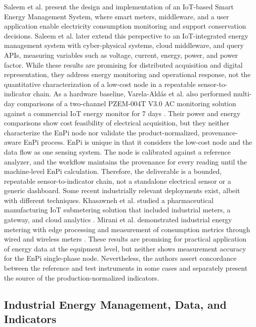 \documentclass[technologies,article,submit,pdftex,moreauthors]{Definitions/mdpi}
\begin{document}
Saleem et al. \cite{ref1} present the design and implementation of an IoT-based Smart Energy Management System, where smart meters, middleware, and a user application enable electricity consumption monitoring and support conservation decisions. Saleem et al. \cite{ref4} later extend this perspective to an IoT-integrated energy management system with cyber-physical systems, cloud middleware, and query APIs, measuring variables such as voltage, current, energy, power, and power factor. 
While these results are promising for distributed acquisition and digital representation, they address energy monitoring and operational response, not the quantitative characterization of a low-cost node in a repeatable sensor-to-indicator chain. As a hardware baseline, Varela-Aldás et al. also performed multi-day comparisons of a two-channel PZEM-004T V3.0 AC monitoring solution against a commercial IoT energy monitor for 7 days \cite{ref24}. Their power and energy comparisons show cost feasibility of electrical acquisition, but they neither characterize the EnPi node nor validate the product-normalized, provenance-aware EnPi process. EnPi is unique in that it considers the low-cost node and the data flow as one sensing system. The node is calibrated against a reference analyzer, and the workflow maintains the provenance for every reading until the machine-level EnPi calculation. Therefore, the deliverable is a bounded, repeatable sensor-to-indicator chain, not a standalone electrical sensor or a generic dashboard. Some recent industrially relevant deployments exist, albeit with different techniques. Khasawneh et al. studied a pharmaceutical manufacturing IoT submetering solution that included industrial meters, a gateway, and cloud analytics \cite{r2_khasawneh2025}. Mirani et al. demonstrated industrial energy metering with edge processing and measurement of consumption metrics through wired and wireless meters \cite{r2_mirani2024}. These results are promising for practical application of energy data at the equipment level, but neither shows measurement accuracy for the EnPi single-phase node. Nevertheless, the authors assert concordance between the reference and test instruments in some cases and separately present the source of the production-normalized indicators.  

\subsection{Industrial Energy Management, Data, and Indicators}
\label{subsec:industrial-energy-management}
\end{document}
